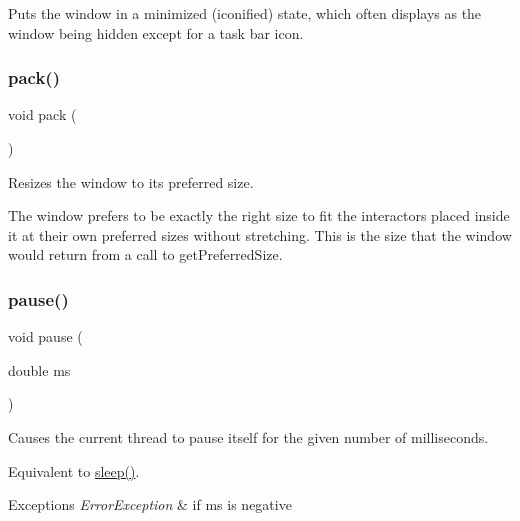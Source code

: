 Puts the window in a minimized (iconified) state, which often displays as the window being hidden except for a task bar icon. 

\mbox{\label{classsgl_1_1GWindow_a915ffc82b17862ab1d2a466a79d23a3f}} 
\subsubsection{\texorpdfstring{pack()}{pack()}}
{\footnotesize\ttfamily void pack (\begin{DoxyParamCaption}{ }\end{DoxyParamCaption})\hspace{0.3cm}{\ttfamily [virtual]}}



Resizes the window to its preferred size. 

The window prefers to be exactly the right size to fit the interactors placed inside it at their own preferred sizes without stretching. This is the size that the window would return from a call to get\+Preferred\+Size. \mbox{\label{classsgl_1_1GWindow_adc7d99bb2dc43b8337e89b7d54cab9d3}} 
\subsubsection{\texorpdfstring{pause()}{pause()}}
{\footnotesize\ttfamily void pause (\begin{DoxyParamCaption}\item[{double}]{ms }\end{DoxyParamCaption})\hspace{0.3cm}{\ttfamily [virtual]}}



Causes the current thread to pause itself for the given number of milliseconds. 

Equivalent to \mbox{\hyperlink{classsgl_1_1GWindow_aa3381590c1ef33c08000c2fbb2bf0dd0}{sleep()}}. 
\begin{DoxyExceptions}{Exceptions}
{\em Error\+Exception} & if ms is negative \\
\hline
\end{DoxyExceptions}
\mbox{\label{classsgl_1_1GWindow_a1c12b1fde5c2ef10d79d4ee51e670efa}} 
